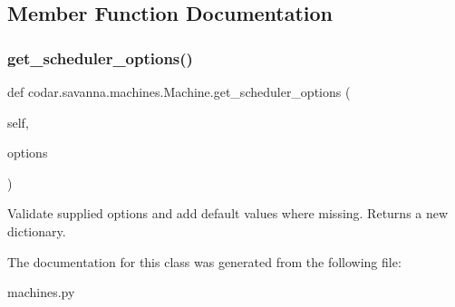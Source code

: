\subsection{Member Function Documentation}
\mbox{\label{classcodar_1_1savanna_1_1machines_1_1_machine_a50a9259a741eef79d1de2529a9d1f1ae}} 
\subsubsection{\texorpdfstring{get\+\_\+scheduler\+\_\+options()}{get\_scheduler\_options()}}
{\footnotesize\ttfamily def codar.\+savanna.\+machines.\+Machine.\+get\+\_\+scheduler\+\_\+options (\begin{DoxyParamCaption}\item[{}]{self,  }\item[{}]{options }\end{DoxyParamCaption})}

\begin{DoxyVerb}Validate supplied options and add default values where missing.
Returns a new dictionary.\end{DoxyVerb}
 

The documentation for this class was generated from the following file\+:\begin{DoxyCompactItemize}
\item 
machines.\+py\end{DoxyCompactItemize}
